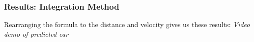 \begin{frame}
\begin{figure}
\begin{minipage}[b]{0.49\linewidth}
    \end{minipage}
  \end{figure}
\end{frame}






\begin{frame}
  \frametitle{Results: Integration Method}
    Rearranging the formula to the distance and velocity gives us these results:
    \center \textit{Video demo of predicted car}
\end{frame}
